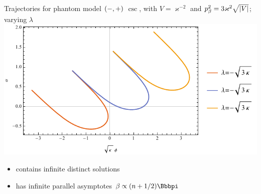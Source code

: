 \documentclass[9pt]{beamer}
\begin{document}
\begin{frame}%
{Trajectories for phantom model ${\left(-,+\right)}$}%
{$\csc$, with $V = \varkappa^{-2}$ and
$p_\beta^2 = 3\varkappa^2\sqrt{{\left|V\right|}}$; varying $\lambda$}
\includegraphics[width=\textwidth]{./plots.nb/csc_lamb_r.pdf}
\begin{itemize}
	\item contains infinite distinct solutions
	\item has infinite parallel asymptotes $\beta \propto \rbr{n+1/2}\pp $
\end{itemize}
\end{frame}
\end{document}
